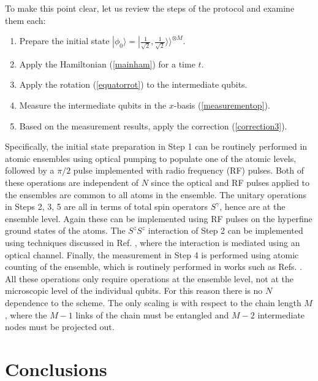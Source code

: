 \documentclass[%
  prx,%
  twocolumn,%
  preprintnumbers,%
  amsmath,%
  amssymb,%
  superscriptaddress%
]{revtex4}
\begin{document}
To make this point clear, let us review the steps of the protocol and examine them each:
%
\begin{enumerate}
\item Prepare the initial state $ | \phi_0 \rangle = |\frac{1}{\sqrt{2}}, \frac{1}{\sqrt{2}} \rangle \rangle^{\otimes M} $. 
\item Apply the Hamiltonian (\ref{mainham}) for a time $ t $. 
\item Apply the rotation (\ref{equatorrot}) to the intermediate qubits. 
\item Measure the intermediate qubits in the $ x $-basis (\ref{measurementop}). 
\item Based on the measurement results, apply the correction (\ref{correction3}).  
\end{enumerate}
%
Specifically, the initial state preparation in Step 1 can be routinely performed in atomic ensembles using optical pumping to populate one of the atomic levels, followed by a $ \pi/2 $ pulse implemented with radio frequency (RF) pulses. Both of these operations are independent of $ N $ since the optical and RF pulses applied to the ensembles are common to all atoms in the ensemble.  The unitary operations in Steps 2, 3, 5 are all in terms of total spin operators $ S^\gamma $, hence are at the ensemble level. Again these can be implemented using RF pulses on the hyperfine ground states of the atoms.  The $ S^z S^z $ interaction of Step 2 can be implemented using techniques discussed in Ref. \cite{pyrkov2013entanglement,hussain2014geometric}, where the interaction is mediated using an optical channel.  Finally, the measurement in Step 4 is performed using atomic counting of the ensemble, which is routinely performed in works such as Refs. \cite{Hume2013,Ott2016,Qu2020}.  All these operations only require operations at the ensemble level, not at the microscopic level of the individual qubits.  For this reason there is no $ N $ dependence to the scheme.  The only scaling is with respect to the chain length $ M $, where the $ M - 1 $ links of the chain must be entangled and $ M - 2$ intermediate nodes must be projected out.  
















\section{Conclusions}
\end{document}
